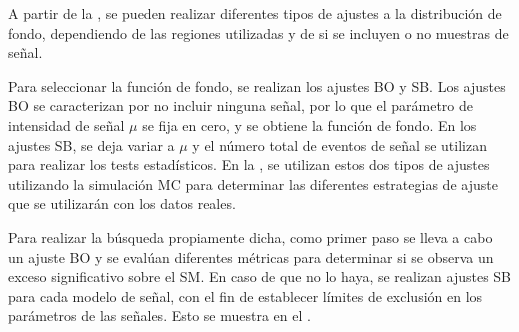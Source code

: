 A partir de la \Eqn{\ref{eq:strategy:stat_treatment:stat_model:likelihood}}, se pueden realizar diferentes tipos de ajustes a la distribución de fondo, dependiendo de las regiones utilizadas y de si se incluyen o no muestras de señal.

Para seleccionar la función de fondo, se realizan los ajustes \ac{BO} y \ac{SB}. Los ajustes \ac{BO} se caracterizan por no incluir ninguna señal, por lo que el parámetro de intensidad de señal \(\mu\) se fija en cero, y se obtiene la función de fondo. En los ajustes \ac{SB}, se deja variar a \(\mu\) y el n\'umero total de eventos de señal se utilizan para realizar los tests estad\'isticos. En la \Sect{\ref{sec:bkg:modeling}}, se utilizan estos dos tipos de ajustes utilizando la simulación \ac{MC} para determinar las diferentes estrategias de ajuste que se utilizarán con los datos reales.


Para realizar la búsqueda propiamente dicha, como primer paso se lleva a cabo un ajuste \ac{BO} y se evalúan diferentes métricas para determinar si se observa un exceso significativo sobre el \ac{SM}. En caso de que no lo haya, se realizan ajustes \ac{SB} para cada modelo de señal, con el fin de establecer límites de exclusión en los par\'ametros de las señales. Esto se muestra en el \Ch{\ref{ch:results}}.